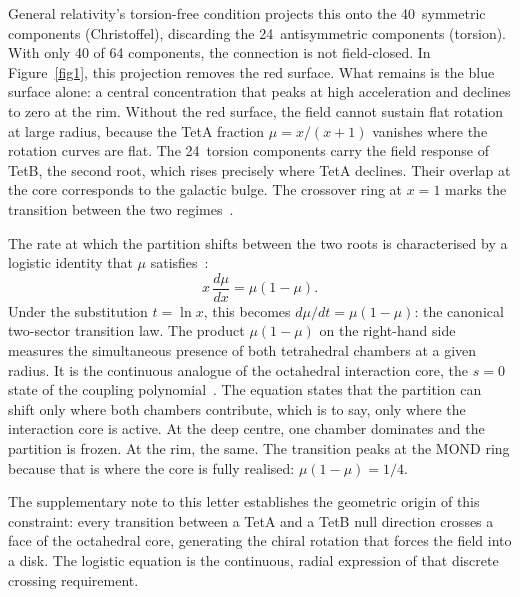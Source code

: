 \documentclass[twocolumn]{iopjournal}
\begin{document}
General relativity's
torsion-free condition projects this onto the 40~symmetric
components (Christoffel), discarding the 24~antisymmetric
components (torsion).  With only 40 of 64 components, the
connection is not field-closed.  In Figure~\ref{fig1}, this projection
removes the red surface.  What remains is the blue surface
alone: a central concentration that peaks at high acceleration
and declines to zero at the rim.  Without the red surface, the
field cannot sustain flat rotation at large radius, because
the TetA fraction $\mu = x/(x{+}1)$ vanishes where the
rotation curves are flat.  The 24~torsion components carry the
field response of TetB, the second root, which rises precisely
where TetA declines.  Their overlap at the core corresponds
to the galactic bulge.  The crossover ring at $x = 1$ marks
the transition between the two
regimes~\cite{FamaeyMcGaugh2012}.

The rate at which the partition shifts between the two roots
is characterised by a logistic identity that $\mu$
satisfies~\cite{Nelson2026b}:
\begin{equation}
  x\,\frac{d\mu}{dx} = \mu(1 - \mu).
  \label{eq:logistic}
\end{equation}
Under the substitution $t = \ln x$, this becomes
$d\mu/dt = \mu(1-\mu)$: the canonical two-sector transition
law.  The product $\mu(1-\mu)$ on the right-hand side measures
the simultaneous presence of both tetrahedral chambers at a
given radius.  It is the continuous analogue of the octahedral
interaction core, the $s = 0$ state of the coupling
polynomial~\cite{Nelson2026b}.  The equation states that the
partition can shift only where both chambers contribute, which
is to say, only where the interaction core is active.  At the
deep centre, one chamber dominates and the partition is frozen.
At the rim, the same.  The transition peaks at the MOND ring
because that is where the core is fully realised:
$\mu(1 - \mu) = 1/4$.

The supplementary note to this letter establishes the
geometric origin of this constraint: every transition between
a TetA and a TetB null direction crosses a face of the
octahedral core, generating the chiral rotation that forces
the field into a disk.  The logistic equation is the
continuous, radial expression of that discrete crossing
requirement.
\end{document}
